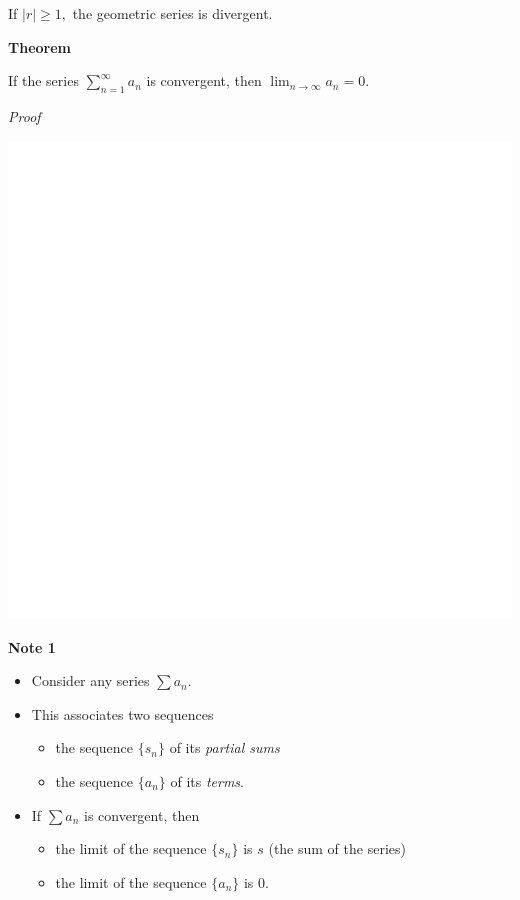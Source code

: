 \documentclass[]{book}
\providecommand{\tightlist}{%
  \setlength{\itemsep}{0pt}\setlength{\parskip}{0pt}}
\begin{document}
If \(|r|\geq1,\) the geometric series is divergent.

\newpage

\textbf{Theorem}

If the series \(\sum_{n=1}^\infty a_n\) is convergent, then \(\lim_{n\to \infty}a_n=0.\)

\emph{Proof}

\begin{center}\includegraphics[width=1\linewidth]{figure/seqbox3-1} \end{center}

\textbf{Note 1}

\begin{itemize}
\item
  Consider any series \(\sum a_n.\)
\item
  This associates two sequences

  \begin{itemize}
  \tightlist
  \item
    the sequence \(\{s_n\}\) of its \emph{partial sums}
  \item
    the sequence \(\{a_n\}\) of its \emph{terms}.
  \end{itemize}
\item
  If \(\sum a_n\) is convergent, then

  \begin{itemize}
  \tightlist
  \item
    the limit of the sequence \(\{s_n\}\) is \(s\) (the sum of the series)
  \item
    the limit of the sequence \(\{a_n\}\) is 0.
  \end{itemize}
\end{itemize}
\end{document}
